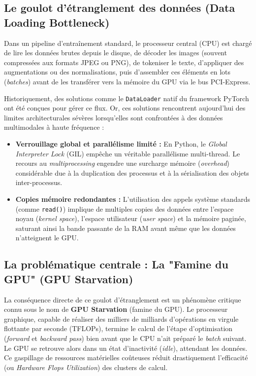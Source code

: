 \documentclass[12pt,a4paper]{report}
\begin{document}
\subsection{Le goulot d'étranglement des données (Data Loading Bottleneck)}

Dans un pipeline d'entraînement standard, le processeur central (CPU) est chargé de lire les données brutes depuis le disque, de décoder les images (souvent compressées aux formats JPEG ou PNG), de tokeniser le texte, d'appliquer des augmentations ou des normalisations, puis d'assembler ces éléments en lots (\textit{batches}) avant de les transférer vers la mémoire du GPU via le bus PCI-Express.

Historiquement, des solutions comme le \texttt{DataLoader} natif du framework PyTorch ont été conçues pour gérer ce flux. Or, ces solutions rencontrent aujourd'hui des limites architecturales sévères lorsqu'elles sont confrontées à des données multimodales à haute fréquence :
\begin{itemize}
    \item \textbf{Verrouillage global et parallélisme limité :} En Python, le \textit{Global Interpreter Lock} (GIL) empêche un véritable parallélisme multi-thread. Le recours au \textit{multiprocessing} engendre une surcharge mémoire (\textit{overhead}) considérable due à la duplication des processus et à la sérialisation des objets inter-processus.
    \item \textbf{Copies mémoire redondantes :} L'utilisation des appels système standards (comme \texttt{read()}) implique de multiples copies des données entre l'espace noyau (\textit{kernel space}), l'espace utilisateur (\textit{user space}) et la mémoire paginée, saturant ainsi la bande passante de la RAM avant même que les données n'atteignent le GPU.
\end{itemize}

\subsection{La problématique centrale : La "Famine du GPU" (GPU Starvation)}

La conséquence directe de ce goulot d'étranglement est un phénomène critique connu sous le nom de \textbf{GPU Starvation} (famine du GPU). Le processeur graphique, capable de réaliser des milliers de milliards d'opérations en virgule flottante par seconde (TFLOPs), termine le calcul de l'étape d'optimisation (\textit{forward} et \textit{backward pass}) bien avant que le CPU n'ait préparé le \textit{batch} suivant. Le GPU se retrouve alors dans un état d'inactivité (\textit{idle}), attendant les données. Ce gaspillage de ressources matérielles coûteuses réduit drastiquement l'efficacité (ou \textit{Hardware Flops Utilization}) des clusters de calcul.
\end{document}
